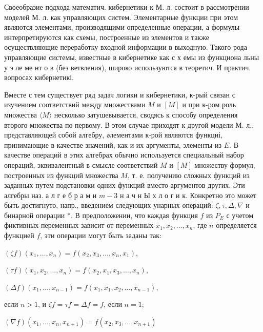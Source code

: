 \documentclass[10pt]{article}
\begin{document}
Своеобразие подхода математич. кибернетики к М. л. состоит в рассмотрении моделей М. л. как управляющих систем. Элементарные функции при этом являются элементами, производящими определенные операции, а формулы интерпретируются как схемы, построенные из элементов и также осуществляющие переработку входной информации в выходную. Такого рода управляющие системы, известные в кибернетике как с х емы из функциона льны у э ле ме нт о в (без ветвления), широко используются в теоретич. И практич. вопросах кибернетикі.



Вместе с тем существует ряд задач логики и кибернетики, к-рый связан с изучением соответствий между множествами $M$ и $[M]$ и при к-ром роль множества $\langle M\rangle$ несколько затушевывается, сводясь к способу определения второго множества по первому. В этом случае приходят к другой модели М. л., представляющей собой алгебру, әлементами к-рой являются функциі, принимающие в качестве значений, как и их аргументы, элементы из $E$. В качестве операций в этих алгебрах обычно используется специальный набор операций, эквивалентный в смысле соответствий $M$ и $[M]$ множеству формул, построенных из функций множества $M$, т. е. получению сложных функций из заданных путем подстановки одних функций вместо аргументов других. Эти алгебры наз. а л г е б р а м и $m-3$ н а ч н Ы х л о г и к. Конкретно это может быть достигнуто, напр., введением следующих унарных операций: $\zeta, \tau, \Delta, \nabla$ и бинарной операции *. В предположении, что каждая функция $f$ из $P_{E}$ с учетом фиктивных переменных зависит от переменных $x_{1}, x_{2}, \ldots, x_{n}$, где $n$ определяется функцией $f$, эти операции могут быть заданы так:



$(\zeta f)\left(x_{1}, \ldots, x_{n}\right)=f\left(x_{2}, x_{3}, \ldots, x_{n}, x_{1}\right)$,



$(\tau f)\left(x_{1}, x_{2}, \ldots, x_{n}\right)=f\left(x_{2}, x_{1}, x_{3}, \ldots, x_{n}\right)$,



$(\Delta f)\left(x_{1}, \ldots, x_{n-1}\right)=f\left(x_{1}, x_{1}, x_{2}, \ldots, x_{n-1}\right)$,



если $n>1$, и $\zeta f=\tau f=\Delta f=f$, если $n=1$;



$(\nabla f)\left(x_{1}, \ldots, x_{n}, x_{n+1}\right)=f\left(x_{2}, x_{3}, \ldots, x_{n+1}\right)$
\end{document}
